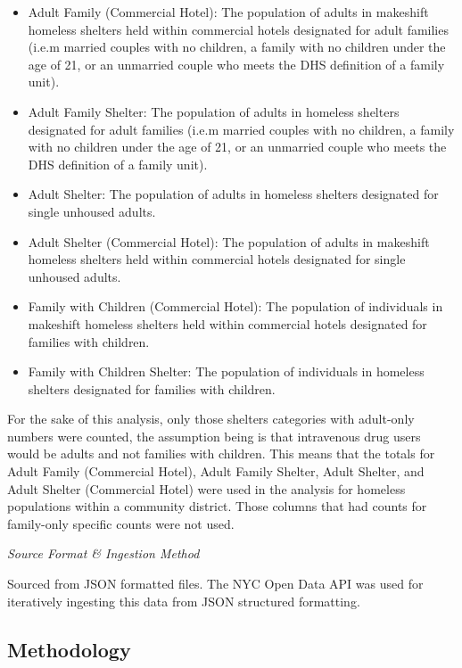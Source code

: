 \documentclass[
]{article}
\begin{document}
\begin{itemize}
\item
  Adult Family (Commercial Hotel): The population of adults in makeshift
  homeless shelters held within commercial hotels designated for adult
  families (i.e.m married couples with no children, a family with no
  children under the age of 21, or an unmarried couple who meets the DHS
  definition of a family unit).
\item
  Adult Family Shelter: The population of adults in homeless shelters
  designated for adult families (i.e.m married couples with no children,
  a family with no children under the age of 21, or an unmarried couple
  who meets the DHS definition of a family unit).
\item
  Adult Shelter: The population of adults in homeless shelters
  designated for single unhoused adults.
\item
  Adult Shelter (Commercial Hotel): The population of adults in
  makeshift homeless shelters held within commercial hotels designated
  for single unhoused adults.
\item
  Family with Children (Commercial Hotel): The population of individuals
  in makeshift homeless shelters held within commercial hotels
  designated for families with children.
\item
  Family with Children Shelter: The population of individuals in
  homeless shelters designated for families with children.
\end{itemize}

For the sake of this analysis, only those shelters categories with
adult-only numbers were counted, the assumption being is that
intravenous drug users would be adults and not families with children.
This means that the totals for Adult Family (Commercial Hotel), Adult
Family Shelter, Adult Shelter, and Adult Shelter (Commercial Hotel) were
used in the analysis for homeless populations within a community
district. Those columns that had counts for family-only specific counts
were not used.

\emph{Source Format \& Ingestion Method}

Sourced from JSON formatted files. The NYC Open Data API was used for
iteratively ingesting this data from JSON structured formatting.

\subsection{Methodology}\label{methodology}
\end{document}
